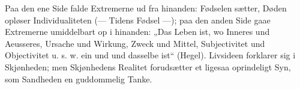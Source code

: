 \documentclass[12pt]{book}
\begin{document}
Paa den ene Side falde Extremerne ud fra hinanden: Fødselen sætter, Døden opløser
Individualiteten (--- Tidens Fødsel ---); paa den anden Side gaae Extremerne umiddelbart
op i hinanden: „Das Leben ist, wo Inneres und Aeusseres, Ursache und Wirkung, Zweck und
Mittel, Subjectivitet und Objectivitet u. s. w. ein und und dasselbe ist“ (Hegel).
Livsideen forklarer sig i Skjønheden; men Skjønhedens Realitet forudsætter et ligesaa
oprindeligt Syn, som Sandheden en guddommelig Tanke.
\end{document}
